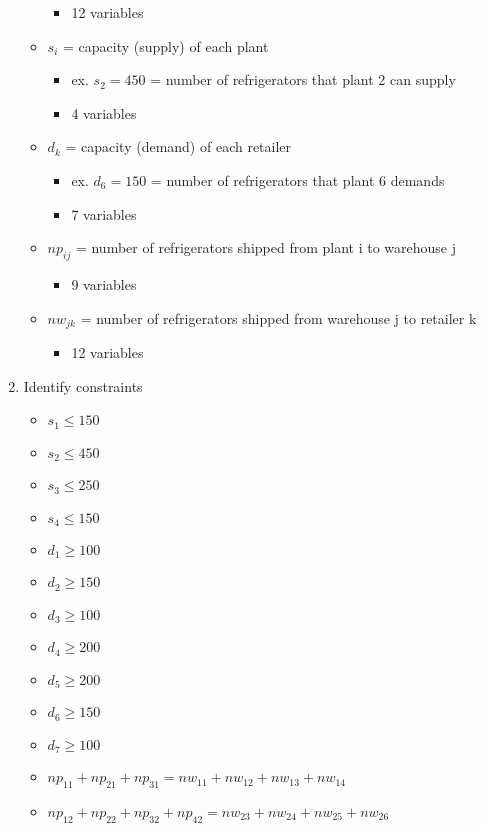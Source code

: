 \documentclass[../report/main.tex]{subfiles}
\begin{document}
\begin{enumerate}[1.]
\begin{itemize}
\begin{itemize}
  			\item  12 variables
		\end{itemize}
		\item $s_i$ = capacity (supply) of each plant
		\begin{itemize}
 			\item   ex. $s_2 = 450$ = number of refrigerators that plant 2 can supply
			\item    4 variables
		\end{itemize}
		\item $d_k$ = capacity (demand) of each retailer
		\begin{itemize}
			\item    ex. $d_6 = 150$ = number of refrigerators that plant 6 demands
			\item    7 variables
		\end{itemize}
		\item $np_{ij}$ = number of refrigerators shipped from plant i to warehouse j
		\begin{itemize}
			\item    9 variables
		\end{itemize}
		\item $nw_{jk}$ = number of refrigerators shipped from warehouse j to retailer k
		\begin{itemize}
			\item    12 variables
		\end{itemize}
	\end{itemize}
	\item Identify constraints
	\begin{itemize}
		\item $s_1 \leq 150$
		\item $s_2 \leq 450$
		\item $s_3 \leq 250$
		\item $s_4 \leq 150$
		\item $d_1 \geq 100$
		\item $d_2 \geq 150$
		\item $d_3 \geq 100$
		\item $d_4 \geq 200$
		\item $d_5 \geq 200$
		\item $d_6 \geq 150$
		\item $d_7 \geq 100$
		\item $np_{11} + np_{21} + np_{31}        = nw_{11} + nw_{12} + nw_{13} + nw_{14}$
		\item $np_{12} + np_{22} + np_{32} + np_{42} =               nw_{23} + nw_{24} + nw_{25} + nw_{26}$

\end{itemize}
\end{enumerate}
\end{document}
